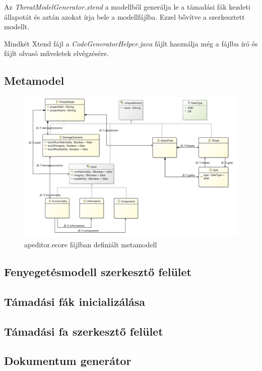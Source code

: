 Az \textit{ThreatModelGenerator.xtend} a modellből generálja le a támadási fák kezdeti állapotát és aztán azokat írja bele a modellfájlba. Ezzel bővítve a szerkesztett modellt.

Mindkét Xtend fájl a \textit{CodeGeneratorHelper.java} fájlt használja még a fájlba író és fájlt olvasó műveletek elvégzésére.

\subsection{Metamodel}

\begin{figure}[!ht]
	\centering
	\includegraphics[width=130mm, keepaspectratio]{figures/05_metamodel.png}
	\caption{apeditor.ecore fájlban definiált metamodell}
	\label{fig:05_metamodel}
\end{figure}

\subsection{Fenyegetésmodell szerkesztő felület}

\subsection{Támadási fák inicializálása}

\subsection{Támadási fa szerkesztő felület}

\subsection{Dokumentum generátor}